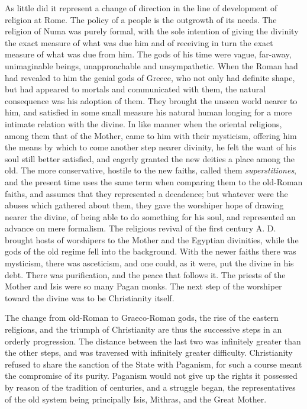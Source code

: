 \documentclass[a4paper, 11pt, oneside, polutonikogreek, english]{article}
\begin{document}
As little did it represent a change of direction in the line of development of religion at Rome. The policy of a people is the outgrowth of its needs. The religion of Numa was purely formal, with the sole intention of giving the divinity the exact measure of what was due him and of receiving in turn the exact measure of what was due from him. The gods of his time were vague, far-away, unimaginable beings, unapproachable and unsympathetic. When the Roman had had revealed to him the genial gods of Greece, who not only had definite shape, but had appeared to mortals and communicated with them, the natural consequence was his adoption of them. They brought the unseen world nearer to him, and satisfied in some small measure his natural human longing for a more intimate relation with the divine. In like manner when the oriental religions, among them that of the Mother, came to him with their mysticism, offering him the means by which to come another step nearer divinity, he felt the want of his soul still better satisfied, and eagerly granted the new deities a place among the old. The more conservative, hostile to the new faiths, called them \emph{superstitiones}, and the present time uses the same term when comparing them to the old-Roman faiths, and assumes that they represented a decadence; but whatever were the abuses which gathered about them, they gave the worshiper hope of drawing nearer the divine, of being able to do something for his soul, and represented an advance on mere formalism. The religious revival of the first century A. D. brought hosts of worshipers to the Mother and the Egyptian divinities, while the gods of the old regime fell into the background. With the newer faiths there was mysticism, there was asceticism, and one could, as it were, put the divine in his debt. There was purification, and the peace that follows it. The priests of the Mother and Isis were so many Pagan monks. The next step of the worshiper toward the divine was to be Christianity itself.

The change from old-Roman to Graeco-Roman gods, the rise of the eastern religions, and the triumph of Christianity are thus the successive steps in an orderly progression. The distance between the last two was infinitely greater than the other steps, and was traversed with infinitely greater difficulty. Christianity refused to share the sanction of the State with Paganism, for such a course meant the compromise of its purity. Paganism would not give up the rights it possessed by reason of the tradition of centuries, and a struggle began, the representatives of the old system being principally Isis, Mithras, and the Great Mother.
\end{document}
